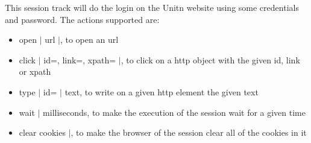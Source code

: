 This session track will do the login on the Unitn website using some credentials and password. The actions supported are:
\begin{itemize}
    \item open $|$ url $|$, to open an url
    \item click $|$ id=, link=, xpath= $|$, to click on a http object with the given id, link or xpath
    \item type $|$ id= $|$ text, to write on a given http element the given text
    \item wait $|$ milliseconds, to make the execution of the session wait for a given time 
    \item clear cookies $|$, to make the browser of the session clear all of the cookies in it
\end{itemize}



